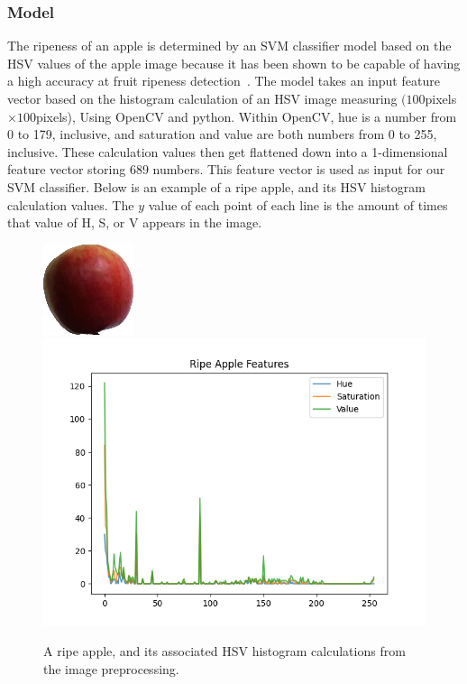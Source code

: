 \subsubsection{Model}
The ripeness of an apple is determined by an SVM classifier model based on the HSV values of the apple image because it has been shown to be capable of having a high accuracy at fruit ripeness detection~\cite{HSVRipeness}.
The model takes an input feature vector based on the histogram calculation of an HSV image measuring $(100$pixels$\times100$pixels), Using OpenCV and python.
Within OpenCV, hue is a number from 0 to 179, inclusive, and saturation and value are both numbers from 0 to 255, inclusive.
These calculation values then get flattened down into a 1-dimensional feature vector storing 689 numbers. 
This feature vector is used as input for our SVM classifier. Below is an example of a ripe apple, and its HSV histogram calculation values. The $y$ value of each point of each line is the amount of times that value of H, S, or V appears in the image.\\
\begin{figure}[!htb]
    \fontsize{7}{5}\selectfont
    \centering
    \includegraphics[scale=0.7]
    {figures/Ripe Apple Example.jpg}
    \includegraphics[scale=.5]
    {figures/ripeness_features.png}
    \label{Ripe Apple Example}
    \caption{
        A ripe apple, and its associated HSV histogram calculations from the image preprocessing.
    }
\end{figure}

